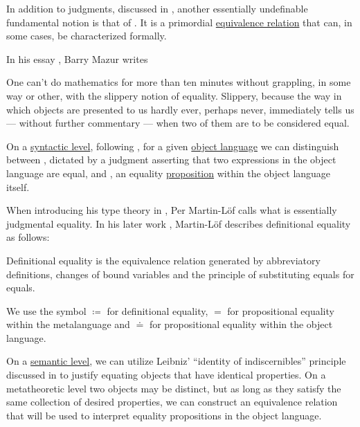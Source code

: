 \begin{concept}\label{con:equality}
  In addition to judgments, discussed in , another essentially undefinable fundamental notion is that of . It is a primordial \hyperref[def:equivalence_relation]{equivalence relation} that can, in some cases, be characterized formally.

  In his essay \cite[\enquote{When is One Thing Equal to Some Other Thing?}, page 222]{GoldSimonsEtAl2008ProofAndOtherDilemmas}, Barry Mazur writes
  \begin{displayquote}
    One can't do mathematics for more than ten minutes without grappling, in some way or other, with the slippery notion of equality. Slippery, because the way in which objects are presented to us hardly ever, perhaps never, immediately tells us --- without further commentary --- when two of them are to be considered equal.
  \end{displayquote}

  On a \hyperref[con:syntax_semantics_duality]{syntactic level}, following \cite[19]{UnivalentProject2024OctoberHoTT}, for a given \hyperref[con:metalogic]{object language} we can distinguish between , dictated by a judgment asserting that two expressions in the object language are equal, and , an equality \hyperref[con:proposition]{proposition} within the object language itself.

  When introducing his type theory in \cite[85]{MartinLöf1984IntuitionisticTypeTheory}, Per Martin-L\"of calls  what is essentially judgmental equality. In his later work \cite[40]{MartinLöf1984IntuitionisticTypeTheory}, Martin-L\"of describes definitional equality as follows:
  \begin{displayquote}
    Definitional equality is the equivalence relation generated by abbreviatory definitions, changes of bound variables and the principle of substituting equals for equals.
  \end{displayquote}

  We use the symbol \( {\coloneqq} \) for definitional equality, \( {=} \) for propositional equality within the metalanguage and \( {\doteq} \) for propositional equality within the object language.

  On a \hyperref[con:syntax_semantics_duality]{semantic level}, we can utilize Leibniz' \enquote{identity of indiscernibles} principle discussed in  to justify equating objects that have identical properties. On a metatheoretic level two objects may be distinct, but as long as they satisfy the same collection of desired properties, we can construct an equivalence relation that will be used to interpret equality propositions in the object language.
\end{concept}

